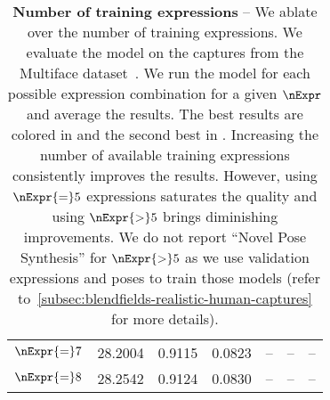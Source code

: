 \begin{table}[!t]
{\begin{tabular}{ccccccc}
      $\nExpr{=}7$                 & \cellcolor{secondbestcolor}28.2004     & \cellcolor{secondbestcolor}0.9115        & 0.0823                            & --                                 & --                                & --                                \\
      $\nExpr{=}8$                 & \cellcolor{firstbestcolor}28.2542      & \cellcolor{firstbestcolor}0.9124         & 0.0830                            & --                                 & --                                & --                                \\
      \bottomrule
    \end{tabular}
  }
  \caption{\textbf{Number of training expressions} -- {
      We ablate over the number of training expressions.
      We evaluate the model on the captures from the Multiface
      dataset~\cite{wuu2022multiface}.
      We run the model for each possible expression combination for a given
      $\nExpr$ and average the results.
      The best results are colored in  and the
      second best in .
      Increasing the number of available training expressions consistently
      improves the results.
      However, using $\nExpr{=}5$ expressions saturates the quality and using
      $\nExpr{>}5$ brings diminishing improvements.
      We do not report ``Novel Pose Synthesis'' for $\nExpr{>}5$ as we use
      validation expressions and poses to train those models (refer
      to~\cref{subsec:blendfields-realistic-human-captures} for more details).
    }
  }
  \label{tab:blendfields-ablation-num-expressions-fix}

\end{table}
